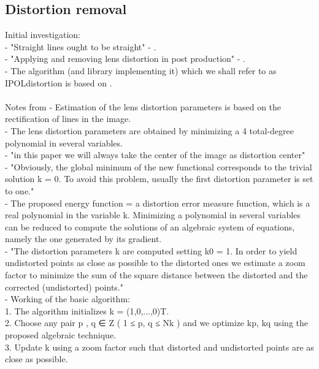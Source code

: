 \subsection{Distortion removal}

Initial investigation:\\
- "Straight lines ought to be straight" - \cite{straightlines} .\\
- "Applying and removing lens distortion in post production" - \cite{postproduction} .\\
- The algorithm (and library implementing it) which we shall refer to as IPOLdistortion is based on \cite{algebraic-distortion} .\\\\

Notes from \cite{algebraic-distortion}
- Estimation of the lens distortion parameters is based on the rectification of lines in the image.\\
- The lens distortion parameters are obtained by minimizing a 4 total-degree polynomial in several variables.\\
- "in this paper we will always take the center of the image as distortion center"\\
- "Obviously, the global minimum of the new functional corresponds to the trivial solution k = 0. To avoid this problem, usually the first distortion parameter is set to one."\\
- The proposed energy function = a distortion error measure function, which is a real polynomial in the variable k. Minimizing a polynomial in several variables can be reduced to compute the solutions of an algebraic system of equations, namely the one generated by its gradient.\\
- "The distortion parameters k are computed setting k0 = 1. In order to yield undistorted points as close as possible to the distorted ones we estimate a zoom factor to minimize the sum of the square distance between the distorted and the corrected (undistorted) points."\\
- Working of the basic algorithm:\\
1. The algorithm initializes k = (1,0,...,0)T.\\
2. Choose any pair p , q ∈ Z ( 1 ≤ p, q ≤ Nk ) and we optimize kp, kq using the proposed algebraic technique.\\
3. Update k using a zoom factor such that distorted and undistorted points are as close as possible.\\\\

